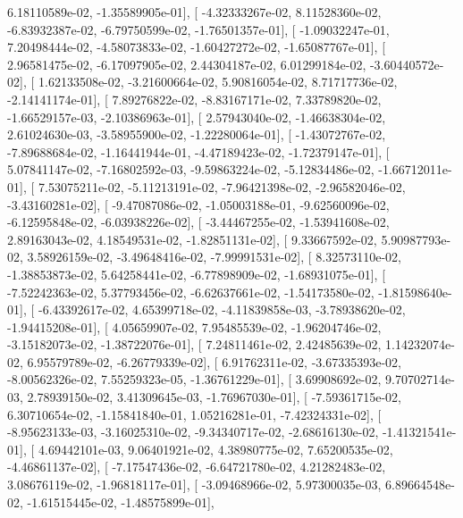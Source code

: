 \documentclass{article}
\begin{document}
          6.18110589e-02,  -1.35589905e-01],
       [ -4.32333267e-02,   8.11528360e-02,  -6.83932387e-02,
         -6.79750599e-02,  -1.76501357e-01],
       [ -1.09032247e-01,   7.20498444e-02,  -4.58073833e-02,
         -1.60427272e-02,  -1.65087767e-01],
       [  2.96581475e-02,  -6.17097905e-02,   2.44304187e-02,
          6.01299184e-02,  -3.60440572e-02],
       [  1.62133508e-02,  -3.21600664e-02,   5.90816054e-02,
          8.71717736e-02,  -2.14141174e-01],
       [  7.89276822e-02,  -8.83167171e-02,   7.33789820e-02,
         -1.66529157e-03,  -2.10386963e-01],
       [  2.57943040e-02,  -1.46638304e-02,   2.61024630e-03,
         -3.58955900e-02,  -1.22280064e-01],
       [ -1.43072767e-02,  -7.89688684e-02,  -1.16441944e-01,
         -4.47189423e-02,  -1.72379147e-01],
       [  5.07841147e-02,  -7.16802592e-03,  -9.59863224e-02,
         -5.12834486e-02,  -1.66712011e-01],
       [  7.53075211e-02,  -5.11213191e-02,  -7.96421398e-02,
         -2.96582046e-02,  -3.43160281e-02],
       [ -9.47087086e-02,  -1.05003188e-01,  -9.62560096e-02,
         -6.12595848e-02,  -6.03938226e-02],
       [ -3.44467255e-02,  -1.53941608e-02,   2.89163043e-02,
          4.18549531e-02,  -1.82851131e-02],
       [  9.33667592e-02,   5.90987793e-02,   3.58926159e-02,
         -3.49648416e-02,  -7.99991531e-02],
       [  8.32573110e-02,  -1.38853873e-02,   5.64258441e-02,
         -6.77898909e-02,  -1.68931075e-01],
       [ -7.52242363e-02,   5.37793456e-02,  -6.62637661e-02,
         -1.54173580e-02,  -1.81598640e-01],
       [ -6.43392617e-02,   4.65399718e-02,  -4.11839858e-03,
         -3.78938620e-02,  -1.94415208e-01],
       [  4.05659907e-02,   7.95485539e-02,  -1.96204746e-02,
         -3.15182073e-02,  -1.38722076e-01],
       [  7.24811461e-02,   2.42485639e-02,   1.14232074e-02,
          6.95579789e-02,  -6.26779339e-02],
       [  6.91762311e-02,  -3.67335393e-02,  -8.00562326e-02,
          7.55259323e-05,  -1.36761229e-01],
       [  3.69908692e-02,   9.70702714e-03,   2.78939150e-02,
          3.41309645e-03,  -1.76967030e-01],
       [ -7.59361715e-02,   6.30710654e-02,  -1.15841840e-01,
          1.05216281e-01,  -7.42324331e-02],
       [ -8.95623133e-03,  -3.16025310e-02,  -9.34340717e-02,
         -2.68616130e-02,  -1.41321541e-01],
       [  4.69442101e-03,   9.06401921e-02,   4.38980775e-02,
          7.65200535e-02,  -4.46861137e-02],
       [ -7.17547436e-02,  -6.64721780e-02,   4.21282483e-02,
          3.08676119e-02,  -1.96818117e-01],
       [ -3.09468966e-02,   5.97300035e-03,   6.89664548e-02,
         -1.61515445e-02,  -1.48575899e-01],
\end{document}
